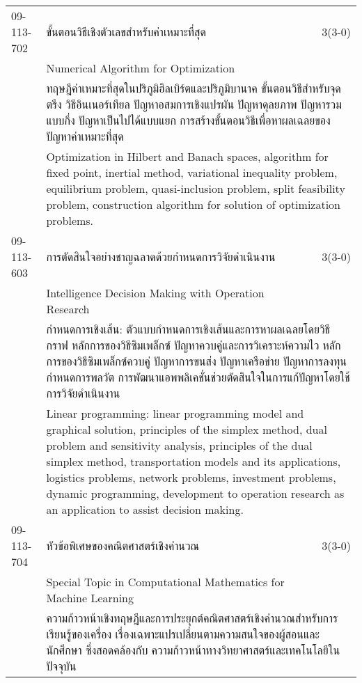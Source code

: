 \begin{longtable}{p{}p{}r{}}
09-113-702 & ขั้นตอนวิธีเชิงตัวเลขสำหรับค่าเหมาะที่สุด  & 3(3-0)\\*
 & Numerical Algorithm for Optimization & \phantom{x} \vspace{3mm} \\*
&  \multicolumn{2}{p{0.75\textwidth}}{ทฤษฎีค่าเหมาะที่สุดในปริภูมิฮิลเบิร์ตและปริภูมิบานาค ขั้นตอนวิธีสำหรับจุดตรึง วิธีอินเนอร์เทียล ปัญหาอสมการเชิงแปรผัน ปัญหาดุลยภาพ ปัญหารวมแบบกึ่ง ปัญหาเป็นไปได้แบบแยก การสร้างขั้นตอนวิธีเพื่อหาผลเฉลยของปัญหาค่าเหมาะที่สุด} \vspace{3mm} \\*
&  \multicolumn{2}{p{0.75\textwidth}}{Optimization in Hilbert and Banach spaces, algorithm for fixed point, inertial method, variational inequality problem, equilibrium problem, quasi-inclusion problem, split feasibility problem, construction algorithm for solution of optimization problems.} \vspace{8mm} \\*
09-113-603 & การตัดสินใจอย่างชาญฉลาดด้วยกำหนดการวิจัยดำเนินงาน & 3(3-0)\\*
 & Intelligence Decision Making with Operation Research & \phantom{x} \vspace{3mm} \\*
&  \multicolumn{2}{p{0.75\textwidth}}{กำหนดการเชิงเส้น: ตัวแบบกำหนดการเชิงเส้นและการหาผลเฉลยโดยวิธีกราฟ หลักการของวิธีซิมเพล็กซ์ ปัญหาควบคู่และการวิเคราะห์ความไว หลักการของวิธีซิมเพล็กซ์ควบคู่ ปัญหาการขนส่ง ปัญหาเครือข่าย ปัญหาการลงทุน กำหนดการพลวัต การพัฒนาแอพพลิเคชั่นช่วยตัดสินใจในการแก้ปัญหาโดยใช้การวิจัยดำเนินงาน} \vspace{3mm} \\*
&  \multicolumn{2}{p{0.75\textwidth}}{Linear programming: linear programming model and graphical solution, principles of the simplex method, dual problem and sensitivity analysis, principles of the dual simplex method, transportation models and its applications, logistics problems, network problems, investment problems, dynamic programming, development to operation research as an application to assist decision making.} \vspace{8mm} \\*
09-113-704 & หัวข้อพิเศษของคณิตศาสตร์เชิงคำนวณ  & 3(3-0)\\*
 & Special Topic in Computational Mathematics for Machine Learning & \phantom{x} \vspace{3mm} \\*
&  \multicolumn{2}{p{0.75\textwidth}}{ความก้าวหน้าเชิงทฤษฎีและการประยุกต์คณิตศาสตร์เชิงคำนวณสำหรับการเรียนรู้ของเครื่อง เรื่องเฉพาะแปรเปลี่ยนตามความสนใจของผู้สอนและนักศึกษา ซึ่งสอดคล้องกับ ความก้าวหน้าทางวิทยาศาสตร์และเทคโนโลยีในปัจจุบัน} \vspace{3mm} \\*

\end{longtable}
